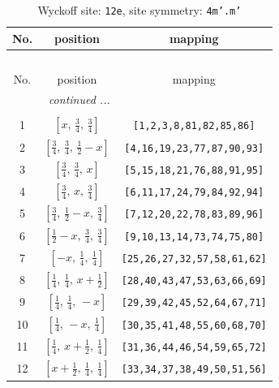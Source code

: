 \documentclass[fleqn,8pt]{jsarticle}
\begin{document}
\begin{longtable}{ccc}
\caption{Wyckoff site: {\tt 12e}, site symmetry: {\tt 4m'.m'}}
 \\
 \hline \hline
No. & position & mapping \\ \hline \endfirsthead

\multicolumn{2}{l}{\tablename\ \thetable{}} \\
 \hline \hline
No. & position & mapping \\ \hline \endhead

 \hline \hline
\multicolumn{2}{r}{\footnotesize\it continued ...} \\ \endfoot

 \hline \hline
\multicolumn{2}{r}{} \\ \endlastfoot

1 & $\left[ x,\, \frac{3}{4},\, \frac{3}{4} \right]$ & {\tt [1,2,3,8,81,82,85,86]} \\ \hline
2 & $\left[ \frac{3}{4},\, \frac{3}{4},\, \frac{1}{2} - x \right]$ & {\tt [4,16,19,23,77,87,90,93]} \\ \hline
3 & $\left[ \frac{3}{4},\, \frac{3}{4},\, x \right]$ & {\tt [5,15,18,21,76,88,91,95]} \\ \hline
4 & $\left[ \frac{3}{4},\, x,\, \frac{3}{4} \right]$ & {\tt [6,11,17,24,79,84,92,94]} \\ \hline
5 & $\left[ \frac{3}{4},\, \frac{1}{2} - x,\, \frac{3}{4} \right]$ & {\tt [7,12,20,22,78,83,89,96]} \\ \hline
6 & $\left[ \frac{1}{2} - x,\, \frac{3}{4},\, \frac{3}{4} \right]$ & {\tt [9,10,13,14,73,74,75,80]} \\ \hline
7 & $\left[ - x,\, \frac{1}{4},\, \frac{1}{4} \right]$ & {\tt [25,26,27,32,57,58,61,62]} \\ \hline
8 & $\left[ \frac{1}{4},\, \frac{1}{4},\, x + \frac{1}{2} \right]$ & {\tt [28,40,43,47,53,63,66,69]} \\ \hline
9 & $\left[ \frac{1}{4},\, \frac{1}{4},\, - x \right]$ & {\tt [29,39,42,45,52,64,67,71]} \\ \hline
10 & $\left[ \frac{1}{4},\, - x,\, \frac{1}{4} \right]$ & {\tt [30,35,41,48,55,60,68,70]} \\ \hline
11 & $\left[ \frac{1}{4},\, x + \frac{1}{2},\, \frac{1}{4} \right]$ & {\tt [31,36,44,46,54,59,65,72]} \\ \hline
12 & $\left[ x + \frac{1}{2},\, \frac{1}{4},\, \frac{1}{4} \right]$ & {\tt [33,34,37,38,49,50,51,56]} \\
\end{longtable}
\end{document}
